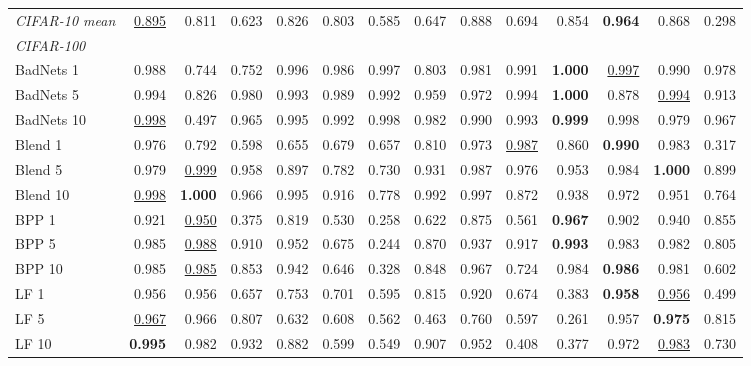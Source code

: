 \begin{table}[htbp]
\begin{adjustbox}{max width=\textwidth}
\begin{tabular}{lrrrrrrrrrrrrr}
\rowcolor{black!8}\emph{CIFAR-10 mean} & \underline{0.895} & 0.811 & 0.623 & 0.826 & 0.803 & 0.585 & 0.647 & 0.888 & 0.694 & 0.854 & \textbf{0.964} & 0.868 & \textcolor{black!45}{0.298} \\
\multicolumn{14}{l}{\emph{CIFAR-100}} \\
BadNets 1 & 0.988 & 0.744 & 0.752 & 0.996 & 0.986 & 0.997 & 0.803 & 0.981 & 0.991 & \textbf{1.000} & \underline{0.997} & 0.990 & 0.978 \\
BadNets 5 & 0.994 & 0.826 & 0.980 & 0.993 & 0.989 & 0.992 & 0.959 & 0.972 & 0.994 & \textbf{1.000} & 0.878 & \underline{0.994} & 0.913 \\
BadNets 10 & \underline{0.998} & \textcolor{black!45}{0.497} & 0.965 & 0.995 & 0.992 & 0.998 & 0.982 & 0.990 & 0.993 & \textbf{0.999} & 0.998 & 0.979 & 0.967 \\
Blend 1 & 0.976 & 0.792 & 0.598 & 0.655 & 0.679 & 0.657 & 0.810 & 0.973 & \underline{0.987} & 0.860 & \textbf{0.990} & 0.983 & \textcolor{black!45}{0.317} \\
Blend 5 & 0.979 & \underline{0.999} & 0.958 & 0.897 & 0.782 & 0.730 & 0.931 & 0.987 & 0.976 & 0.953 & 0.984 & \textbf{1.000} & 0.899 \\
Blend 10 & \underline{0.998} & \textbf{1.000} & 0.966 & 0.995 & 0.916 & 0.778 & 0.992 & 0.997 & 0.872 & 0.938 & 0.972 & 0.951 & 0.764 \\
BPP 1 & 0.921 & \underline{0.950} & \textcolor{black!45}{0.375} & 0.819 & 0.530 & \textcolor{black!45}{0.258} & 0.622 & 0.875 & 0.561 & \textbf{0.967} & 0.902 & 0.940 & 0.855 \\
BPP 5 & 0.985 & \underline{0.988} & 0.910 & 0.952 & 0.675 & \textcolor{black!45}{0.244} & 0.870 & 0.937 & 0.917 & \textbf{0.993} & 0.983 & 0.982 & 0.805 \\
BPP 10 & 0.985 & \underline{0.985} & 0.853 & 0.942 & 0.646 & \textcolor{black!45}{0.328} & 0.848 & 0.967 & 0.724 & 0.984 & \textbf{0.986} & 0.981 & 0.602 \\
LF 1 & 0.956 & 0.956 & 0.657 & 0.753 & 0.701 & 0.595 & 0.815 & 0.920 & 0.674 & \textcolor{black!45}{0.383} & \textbf{0.958} & \underline{0.956} & \textcolor{black!45}{0.499} \\
LF 5 & \underline{0.967} & 0.966 & 0.807 & 0.632 & 0.608 & 0.562 & \textcolor{black!45}{0.463} & 0.760 & 0.597 & \textcolor{black!45}{0.261} & 0.957 & \textbf{0.975} & 0.815 \\
LF 10 & \textbf{0.995} & 0.982 & 0.932 & 0.882 & 0.599 & 0.549 & 0.907 & 0.952 & \textcolor{black!45}{0.408} & \textcolor{black!45}{0.377} & 0.972 & \underline{0.983} & 0.730 \\

\end{tabular}
\end{adjustbox}
\end{table}
